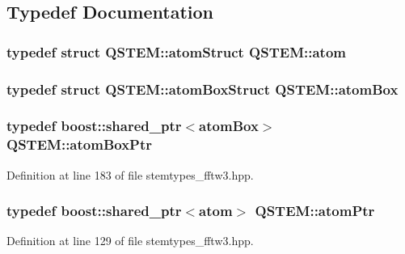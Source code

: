 \subsection{Typedef Documentation}
\hypertarget{namespace_q_s_t_e_m_a402dabc31a7a1fe906d0cdd138c69686}{
\subsubsection[{atom}]{\setlength{\rightskip}{0pt plus 5cm}typedef struct {\bf Q\-S\-T\-E\-M\-::atom\-Struct}  {\bf Q\-S\-T\-E\-M\-::atom}}}\label{namespace_q_s_t_e_m_a402dabc31a7a1fe906d0cdd138c69686}
\hypertarget{namespace_q_s_t_e_m_a01d849e4884ae956a16b24c2286e3494}{
\subsubsection[{atom\-Box}]{\setlength{\rightskip}{0pt plus 5cm}typedef struct {\bf Q\-S\-T\-E\-M\-::atom\-Box\-Struct}  {\bf Q\-S\-T\-E\-M\-::atom\-Box}}}\label{namespace_q_s_t_e_m_a01d849e4884ae956a16b24c2286e3494}
\hypertarget{namespace_q_s_t_e_m_a834093bc53d08abeb557de742e38541e}{
\subsubsection[{atom\-Box\-Ptr}]{\setlength{\rightskip}{0pt plus 5cm}typedef boost\-::shared\-\_\-ptr$<${\bf atom\-Box}$>$ {\bf Q\-S\-T\-E\-M\-::atom\-Box\-Ptr}}}\label{namespace_q_s_t_e_m_a834093bc53d08abeb557de742e38541e}


Definition at line 183 of file stemtypes\-\_\-fftw3.\-hpp.

\hypertarget{namespace_q_s_t_e_m_aab1af41d80d466190a68f7b9da5740bc}{
\subsubsection[{atom\-Ptr}]{\setlength{\rightskip}{0pt plus 5cm}typedef boost\-::shared\-\_\-ptr$<${\bf atom}$>$ {\bf Q\-S\-T\-E\-M\-::atom\-Ptr}}}\label{namespace_q_s_t_e_m_aab1af41d80d466190a68f7b9da5740bc}


Definition at line 129 of file stemtypes\-\_\-fftw3.\-hpp.

